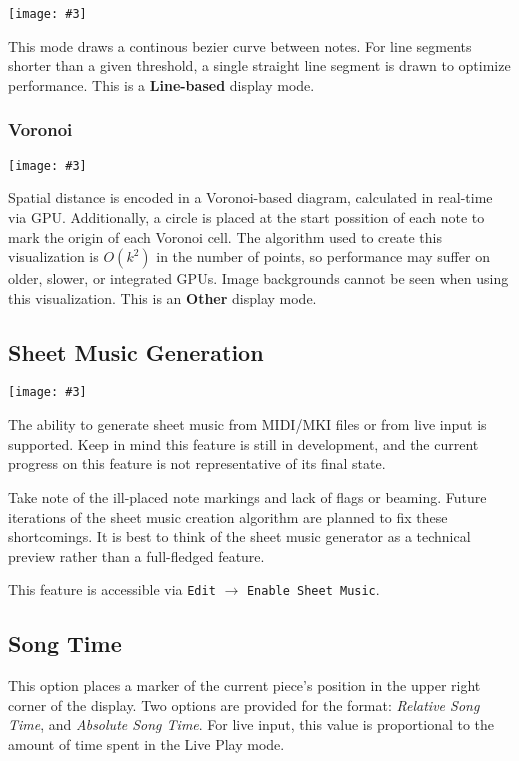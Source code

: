 \documentclass[english]{article}
\makeatletter
\newenvironment{restoretext}%
    {\@parboxrestore%
     \begin{adjustwidth}{}{\leftmargin}%
    }{\end{adjustwidth}
     }
\def\rcbegin{\begin{restoretext}\centering}
\def\rcend{\end{restoretext}}
\newcommand{\rcgnc}[3][]{
  \rcbegin
    \texttt{[image: \#3]}
  \rcend
  \vspace{1em}
}
\providecommand{\mi}[1]{\texttt{#1}}
\makeatother
\begin{document}
\rcgnc{0.86}{image/line.png}

This mode draws a continous bezier curve between notes. For line segments shorter than a given threshold,
a single straight line segment is drawn to optimize performance.
This is a \textbf{Line-based} display mode.


\subsubsection{Voronoi}

\rcgnc{0.86}{image/voronoi.png}

Spatial distance is encoded in a Voronoi-based diagram, calculated in real-time via GPU. Additionally, a circle
is placed at the start possition of each note to mark the origin of each Voronoi cell. The algorithm used to 
create this visualization is $O(k^2)$ in the number of points, so performance may suffer on older, slower, or 
integrated GPUs. Image backgrounds cannot be seen when using this visualization.
This is an \textbf{Other} display mode.

\newpage

\subsection{Sheet Music Generation}

\rcgnc{1.0}{image/sheet.png}

The ability to generate sheet music from MIDI/MKI files or from live input is supported.
Keep in mind this feature is still in development, and the current progress on this feature
is not representative of its final state.

Take note of the ill-placed note markings and lack of flags or beaming. Future iterations of the
sheet music creation algorithm are planned to fix these shortcomings. It is best to think of the
sheet music generator as a technical preview rather than a full-fledged feature.

This feature is accessible via \mi{Edit} $\rightarrow$ \mi{Enable Sheet Music}.

\subsection{Song Time}

This option places a marker of the current piece's position in the upper right corner of the display.
Two options are provided for the format: \textit{Relative Song Time}, and \textit{Absolute Song Time}.
For live input, this value is proportional to the amount of time spent in the Live Play mode.
\end{document}

